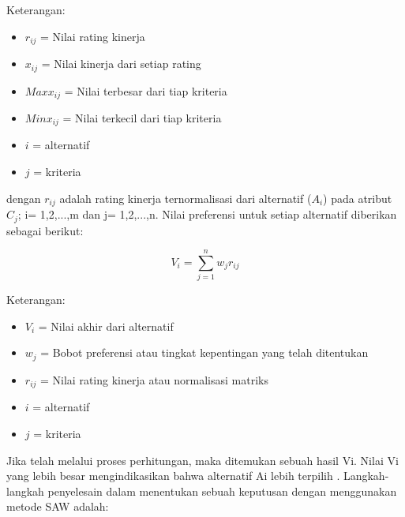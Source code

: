 	
	Keterangan:
	
	\begin{itemize}
		\item $r_{ij}$ = Nilai rating kinerja
		\item $x_{ij}$ = Nilai kinerja dari setiap rating
		\item $Max 	 x_{ij}$ = Nilai terbesar dari tiap kriteria
		\item $Min 	 x_{ij}$ = Nilai terkecil dari tiap kriteria
		\item $i$ = alternatif
		\item $j$ = kriteria
\end{itemize}
	
dengan $r_{ij}$ adalah rating kinerja ternormalisasi dari alternatif ($A_{i}$) pada atribut $C_{j}$; i= 1,2,...,m dan j= 1,2,...,n. Nilai preferensi untuk setiap alternatif diberikan sebagai berikut: 

\[
 V_{i} =\displaystyle\sum_{j=1}^{n} w_{j} r_{ij}
\]

Keterangan:
\begin{itemize}
	\item $V_{i}$ = Nilai akhir dari alternatif
	\item $w_{j}$ = Bobot preferensi atau tingkat kepentingan yang telah ditentukan
	\item $r_{ij}$ = Nilai rating kinerja atau normalisasi matriks
	\item $i$ = alternatif
		\item $j$ = kriteria
\end{itemize}
	
	Jika telah melalui proses perhitungan, maka ditemukan sebuah hasil Vi. Nilai Vi yang lebih besar mengindikasikan bahwa alternatif Ai lebih terpilih \cite{karakteristikspk}. Langkah-langkah penyelesain dalam menentukan sebuah keputusan dengan menggunakan metode SAW adalah:
	

